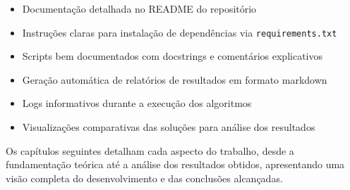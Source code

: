 \documentclass[12pt, a4paper]{report}
\begin{document}
\begin{itemize}
    \item Documentação detalhada no README do repositório
    \item Instruções claras para instalação de dependências via \texttt{requirements.txt}
    \item Scripts bem documentados com docstrings e comentários explicativos
    \item Geração automática de relatórios de resultados em formato markdown
    \item Logs informativos durante a execução dos algoritmos
    \item Visualizações comparativas das soluções para análise dos resultados
\end{itemize}

Os capítulos seguintes detalham cada aspecto do trabalho, desde a fundamentação teórica até a análise dos resultados obtidos, apresentando uma visão completa do desenvolvimento e das conclusões alcançadas.

\newpage
\renewcommand{\refname}{Referências Bibliográficas}

\nocite{*}
\end{document}
